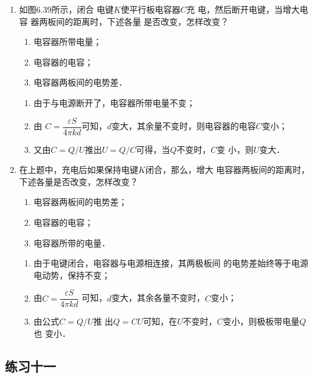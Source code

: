 \begin{enumerate}
\begin{solution}
\end{solution}

\item 如图6.39所示，闭合
电键$K$使平行板电容器$C$充
电，然后断开电键，当增大电容
器两板间的距离时，下述各量
是否改变，怎样改变？
\begin{enumerate}
	\item 电容器所带电量；
	\item 电容器的电容；
	\item 电容器两板间的电势差．
\end{enumerate}

\begin{solution}
\begin{enumerate}
    \item 由于与电源断开了，电容器所带电量不变；
    \item 由
    $C=\dfrac{\varepsilon S}{4\pi kd}$可知，$d$变大，其余量不变时，则电容器的电容$C$变小；
    \item 又由$C=Q/U$推出$U=Q/C$可得，当$Q$不变时，$C$变
    小，则$U$变大．
\end{enumerate}
\end{solution}

\item 在上题中，充电后如果保持电键$K$闭合，那么，增大
电容器两板间的距离时，下述各量是否改变，怎样改变？
\begin{enumerate}
	\item 电容器两板间的电势差；
	\item 电容器的电容；
	\item 电容器所带的电量．
\end{enumerate}

\begin{solution}
\begin{enumerate}
    \item 由于电键闭合，电容器与电源相连接，其两极板间
    的电势差始终等于电源电动势，保持不变；
    \item 由$C=\dfrac{\varepsilon S}{4\pi kd}$
    可知，$d$变大，其余各量不变时，$C$变小；
    \item 由公式$C=Q/U$推
    出$Q=CU$可知，在$U$不变时，$C$变小，则极板带电量$Q$也
    变小．
\end{enumerate}
\end{solution}

\end{enumerate}



\subsection{练习十一}

